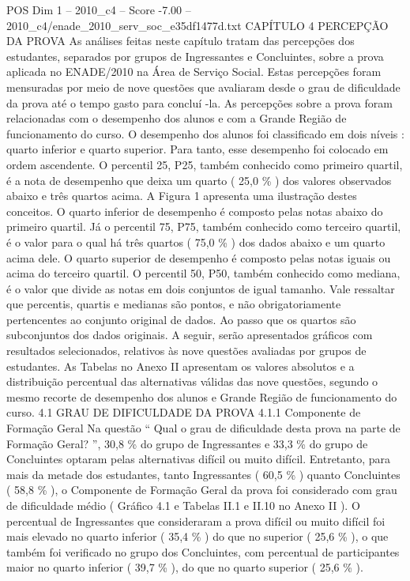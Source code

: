 \begin{textsample}{POS Dim 1 – 2010\_c4 – Score -7.00 – 2010\_c4/enade\_2010\_serv\_soc\_e35df1477d.txt}  \label{ex:f1_pos_410}
CAPÍTULO 4 PERCEPÇÃO DA PROVA As análises feitas neste capítulo tratam das percepções dos estudantes, separados por grupos de Ingressantes e Concluintes, sobre a prova aplicada no ENADE/2010 na Área de Serviço Social.
Estas percepções foram mensuradas por meio de nove questões que avaliaram desde o grau de dificuldade da prova até o tempo gasto para concluí -la.
As percepções sobre a prova foram relacionadas com o desempenho dos alunos e com a Grande Região de funcionamento do curso.
O desempenho dos alunos foi classificado em dois níveis : quarto inferior e quarto superior.
Para tanto, esse desempenho foi colocado em ordem ascendente.
O percentil 25, P25, também conhecido como primeiro quartil, é a nota de desempenho que deixa um quarto ( 25,0 \% ) dos valores observados abaixo e três quartos acima.
A Figura 1 apresenta uma ilustração destes conceitos.
O quarto inferior de desempenho é composto pelas notas abaixo do primeiro quartil.
Já o percentil 75, P75, também conhecido como terceiro quartil, é o valor para o qual há três quartos ( 75,0 \% ) dos dados abaixo e um quarto acima dele.
O quarto superior de desempenho é composto pelas notas iguais ou acima do terceiro quartil.
O percentil 50, P50, também conhecido como mediana, é o valor que divide as notas em dois conjuntos de igual tamanho.
Vale ressaltar que percentis, quartis e medianas são pontos, e não obrigatoriamente pertencentes ao conjunto original de dados.
Ao passo que os quartos são subconjuntos dos dados originais.
A seguir, serão apresentados gráficos com resultados selecionados, relativos às nove questões avaliadas por grupos de estudantes.
As Tabelas no Anexo II apresentam os valores absolutos e a distribuição percentual das alternativas válidas das nove questões, segundo o mesmo recorte de desempenho dos alunos e Grande Região de funcionamento do curso. 4.1 GRAU DE DIFICULDADE DA PROVA 4.1.1 Componente de Formação Geral Na questão “ Qual o grau de dificuldade desta prova na parte de Formação Geral? ”, 30,8 \% do grupo de Ingressantes e 33,3 \% do grupo de Concluintes optaram pelas alternativas difícil ou muito difícil.
Entretanto, para mais da metade dos estudantes, tanto Ingressantes ( 60,5 \% ) quanto Concluintes ( 58,8 \% ), o Componente de Formação Geral da prova foi considerado com grau de dificuldade médio ( Gráfico 4.1 e Tabelas II.1 e II.10 no Anexo II ).
O percentual de Ingressantes que consideraram a prova difícil ou muito difícil foi mais elevado no quarto inferior ( 35,4 \% ) do que no superior ( 25,6 \% ), o que também foi verificado no grupo dos Concluintes, com percentual de participantes maior no quarto inferior ( 39,7 \% ), do que no quarto superior ( 25,6 \% ).

\end{textsample}
